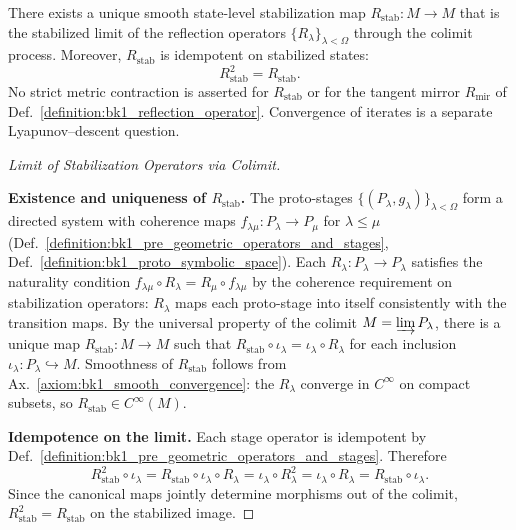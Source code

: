 \begin{theorem}
\label{theorem:bk1_emergence_of_reflection_operator}
There exists a unique smooth state-level stabilization map
$R_{\mathrm{stab}}: M \to M$ that is the stabilized limit of the reflection
operators $\{R_\lambda\}_{\lambda < \Omega}$ through the colimit process.
Moreover, \(R_{\mathrm{stab}}\) is idempotent on stabilized states:
\[
R_{\mathrm{stab}}^2 = R_{\mathrm{stab}}.
\]
No strict metric contraction is asserted for \(R_{\mathrm{stab}}\) or for the
tangent mirror \(R_{\mathrm{mir}}\) of Def.~\ref{definition:bk1_reflection_operator}.
Convergence of iterates is a separate Lyapunov--descent question.

\begin{proof}[Limit of Stabilization Operators via Colimit]
\label{proof:bk1_sketch_limit_stabilization_colimit}
\leavevmode

\textbf{Existence and uniqueness of \(R_{\mathrm{stab}}\).}
The proto-stages $\{(P_\lambda, g_\lambda)\}_{\lambda < \Omega}$ form a directed system with
coherence maps $f_{\lambda\mu}: P_\lambda \to P_\mu$ for $\lambda \leq \mu$
(Def.~\ref{definition:bk1_pre_geometric_operators_and_stages},
Def.~\ref{definition:bk1_proto_symbolic_space}).
Each $R_\lambda: P_\lambda \to P_\lambda$ satisfies the naturality condition
$f_{\lambda\mu} \circ R_\lambda = R_\mu \circ f_{\lambda\mu}$ by the coherence requirement
on stabilization operators: $R_\lambda$ maps each proto-stage into itself consistently with
the transition maps. By the universal property of the colimit
$M = \varinjlim P_\lambda$, there is a unique map $R_{\mathrm{stab}}: M \to M$ such that
$R_{\mathrm{stab}} \circ \iota_\lambda = \iota_\lambda \circ R_\lambda$ for each inclusion
$\iota_\lambda: P_\lambda \hookrightarrow M$.
Smoothness of \(R_{\mathrm{stab}}\) follows from Ax.~\ref{axiom:bk1_smooth_convergence}: the
$R_\lambda$ converge in $C^\infty$ on compact subsets, so \(R_{\mathrm{stab}}\in C^\infty(M)\).

\textbf{Idempotence on the limit.}
Each stage operator is idempotent by Def.~\ref{definition:bk1_pre_geometric_operators_and_stages}. Therefore
\[
R_{\mathrm{stab}}^2 \circ \iota_\lambda
= R_{\mathrm{stab}}\circ \iota_\lambda\circ R_\lambda
= \iota_\lambda\circ R_\lambda^2
= \iota_\lambda\circ R_\lambda
= R_{\mathrm{stab}}\circ \iota_\lambda.
\]
Since the canonical maps jointly determine morphisms out of the colimit,
\(R_{\mathrm{stab}}^2=R_{\mathrm{stab}}\) on the stabilized image.
\end{proof}
\end{theorem}

